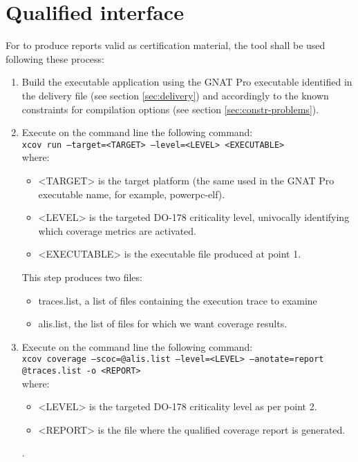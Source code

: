 \documentclass {report}
\begin{document}
\section{Qualified interface}
\label{sec:qual-interface}
For \xcov to produce reports valid as certification material, the tool shall be used following these process:
\begin{enumerate}
\item Build the executable application using the GNAT Pro executable identified in the delivery file (see section \ref{sec:delivery}) and accordingly to the known constraints for compilation options (see section \ref{sec:constr-problems}).

\item Execute on the command line the following command:\\

\texttt{xcov run --target=<TARGET> --level=<LEVEL> <EXECUTABLE>} \\

where:
\begin{itemize}
\item <TARGET> is the target platform (the same used in the GNAT Pro executable name, for example, powerpc-elf).
\item <LEVEL> is the targeted DO-178 criticality level, univocally identifying which coverage metrics are activated.
\item <EXECUTABLE> is the executable file produced at point 1.
\end{itemize}

This step produces two files:
\begin{itemize}
\item traces.list, a list of files containing the execution trace to examine
\item alis.list, the list of files for which we want coverage results.
\end{itemize}

\item Execute on the command line the following command:\\

\texttt{xcov coverage --scoc=@alis.list --level=<LEVEL> --anotate=report @traces.list -o <REPORT>} \\

where:

\begin{itemize}
\item <LEVEL> is the targeted DO-178 criticality level as per point 2.
\item <REPORT> is the file where the qualified coverage report is generated.
\end{itemize}.

\end{enumerate}
\end{document}
